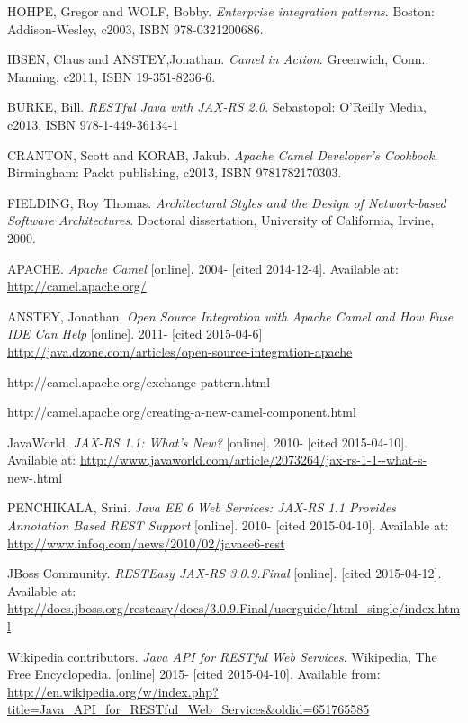 \documentclass[12pt,final,oneside]{fithesis2}
\begin{document}
\begin{thebibliography}{}


 HOHPE, Gregor and WOLF, Bobby. \textit{Enterprise integration patterns}. Boston: Addison-Wesley, c2003, ISBN 978-0321200686.

 IBSEN, Claus and ANSTEY,Jonathan. \textit{Camel in Action}. Greenwich, Conn.: Manning, c2011, ISBN 19-351-8236-6.

 BURKE, Bill. \textit{RESTful Java with JAX-RS 2.0}. Sebastopol: O'Reilly Media, c2013, ISBN 978-1-449-36134-1

 CRANTON, Scott and KORAB, Jakub. \textit{Apache Camel Developer's Cookbook}.  Birmingham: Packt publishing, c2013, ISBN 9781782170303.

 FIELDING, Roy Thomas. \textit{Architectural Styles and the Design of Network-based Software Architectures}. Doctoral dissertation, University of California, Irvine, 2000. 

 APACHE. \textit{Apache Camel} [online]. 2004- [cited 2014-12-4]. Available at: \url{http://camel.apache.org/}

 ANSTEY, Jonathan. \textit{Open Source Integration with Apache Camel and How Fuse IDE Can Help} [online]. 2011- [cited 2015-04-6] \url{http://java.dzone.com/articles/open-source-integration-apache}

 http://camel.apache.org/exchange-pattern.html

 http://camel.apache.org/creating-a-new-camel-component.html




 JavaWorld. \textit{JAX-RS 1.1: What's New?} [online]. 2010- [cited 2015-04-10]. Available at: \url{http://www.javaworld.com/article/2073264/jax-rs-1-1--what-s-new-.html}


  PENCHIKALA, Srini. \textit{
Java EE 6 Web Services: JAX-RS 1.1 Provides Annotation Based REST Support} [online]. 2010- [cited 2015-04-10]. Available at: \url{http://www.infoq.com/news/2010/02/javaee6-rest}

 JBoss Community. \textit{RESTEasy JAX-RS 3.0.9.Final} [online]. [cited 2015-04-12]. Available at: \url{http://docs.jboss.org/resteasy/docs/3.0.9.Final/userguide/html_single/index.html}

Wikipedia contributors. \textit{Java API for RESTful Web Services}. Wikipedia, The Free Encyclopedia. [online] 2015- [cited 2015-04-10]. Available from: \url{http://en.wikipedia.org/w/index.php?title=Java_API_for_RESTful_Web_Services&oldid=651765585} 



\end{thebibliography}
\end{document}
